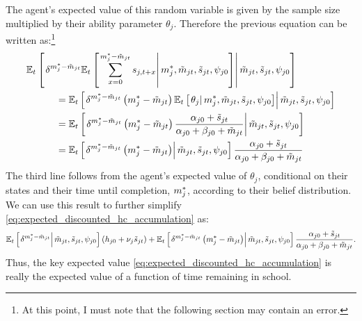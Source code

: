 The agent's expected value of this random variable is given by the sample size multiplied by their ability parameter $\theta_j$. 
Therefore the previous equation can be written as:\footnote{
    At this point, I must note that the following section may contain an error. 
}
\begin{align}
    \nonumber
    \mathbb{E}_t &\left[\left. 
        \delta^{m_j^* - \tilde{m}_{jt}}
        \mathbb{E}_t \left[\left. 
            \sum_{x=0}^{m_j^* - \tilde{m}_{jt}} s_{j, t + x}
         \right\vert m_j^*, \tilde{m}_{jt}, \tilde{s}_{jt}, \psi_{j0} \right]
     \right\vert \tilde{m}_{jt}, \tilde{s}_{jt}, \psi_{j0} \right]
    \\
    \nonumber
    &\quad\quad=
    \mathbb{E}_t \left[\left. 
        \delta^{m_j^* - \tilde{m}_{jt}}
        \left( m_j^* - \tilde{m}_{jt} \right)
        \mathbb{E}_t \left[\left. 
            \theta_j
         \right\vert m_j^*, \tilde{m}_{jt}, \tilde{s}_{jt}, \psi_{j0} \right]
     \right\vert \tilde{m}_{jt}, \tilde{s}_{jt}, \psi_{j0} \right]
    \\
    \nonumber
    &\quad\quad=
    \mathbb{E}_t \left[\left. 
        \delta^{m_j^* - \tilde{m}_{jt}}
        \left( m_j^* - \tilde{m}_{jt} \right)
        \frac{\alpha_{j0} + \tilde{s}_{j t}}{\alpha_{j0} + \beta_{j0} + \tilde{m}_{jt}}
     \right\vert \tilde{m}_{jt}, \tilde{s}_{jt}, \psi_{j0} \right]    
    \\
    \nonumber
    &\quad\quad=
    \mathbb{E}_t \left[\left. 
        \delta^{m_j^* - \tilde{m}_{jt}}
        \left( m_j^* - \tilde{m}_{jt} \right)
     \right\vert \tilde{m}_{jt}, \tilde{s}_{jt}, \psi_{j0} \right]
    \frac{\alpha_{j0} + \tilde{s}_{j t}}{\alpha_{j0} + \beta_{j0} + \tilde{m}_{jt}}
\end{align}
The third line follows from the agent's expected value of $\theta_j$, conditional on their states and their time until completion, $m_j^*$, according to their belief distribution.
We can use this result to further simplify \eqref{eq:expected_discounted_hc_accumulation} as:
\begin{equation*}
    \mathbb{E}_t \left[\left. 
        \delta^{m_j^* - \tilde{m}_{jt}}        
     \right\vert \tilde{m}_{jt}, \tilde{s}_{jt}, \psi_{j0} \right] \left( h_{j0} + \nu_j \tilde{s}_{j t} \right)
    + 
    \mathbb{E}_t \left[\left. 
        \delta^{m_j^* - \tilde{m}_{jt}}
        \left( m_j^* - \tilde{m}_{jt} \right)
     \right\vert \tilde{m}_{jt}, \tilde{s}_{jt}, \psi_{j0} \right]
    \frac{\alpha_{j0} + \tilde{s}_{j t}}{\alpha_{j0} + \beta_{j0} + \tilde{m}_{jt}}.
\end{equation*}
Thus, the key expected value \eqref{eq:expected_discounted_hc_accumulation} is really the expected value of a function of time remaining in school.

